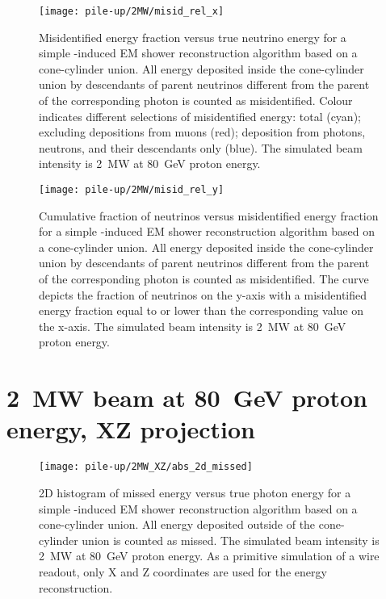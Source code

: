 \begin{figure}[htb]
	\centering
	\texttt{[image: pile-up/2MW/misid\_rel\_x]}
	\caption{Misidentified energy fraction versus true neutrino energy for a simple \Pgpz-induced EM shower reconstruction algorithm based on a cone-cylinder union.
		All energy deposited inside the cone-cylinder union by descendants of parent neutrinos different from the parent of the corresponding \Pgpz photon is counted as misidentified.
		Colour indicates different selections of misidentified energy: total (cyan); excluding depositions from muons (red); deposition from photons, neutrons, and their descendants only (blue).
		The simulated beam intensity is \SI{2}{\mega\watt} at \SI{80}{\giga\electronvolt} proton energy.}
\end{figure}

\begin{figure}[htb]
	\centering
	\texttt{[image: pile-up/2MW/misid\_rel\_y]}
	\caption{Cumulative fraction of neutrinos versus misidentified energy fraction for a simple \Pgpz-induced EM shower reconstruction algorithm based on a cone-cylinder union.
		All energy deposited inside the cone-cylinder union by descendants of parent neutrinos different from the parent of the corresponding \Pgpz photon is counted as misidentified.
		The curve depicts the fraction of neutrinos on the y-axis with a misidentified energy fraction equal to or lower than the corresponding value on the x-axis.
		The simulated beam intensity is \SI{2}{\mega\watt} at \SI{80}{\giga\electronvolt} proton energy.}
\end{figure}

\clearpage


\section{\SI{2}{\mega\watt} beam at \SI{80}{\giga\electronvolt} proton energy, XZ projection}

\begin{figure}[htb]
	\centering
	\texttt{[image: pile-up/2MW\_XZ/abs\_2d\_missed]}
	\caption{2D histogram of missed energy versus true photon energy for a simple \Pgpz-induced EM shower reconstruction algorithm based on a cone-cylinder union.
		All energy deposited outside of the cone-cylinder union is counted as missed.
		The simulated beam intensity is \SI{2}{\mega\watt} at \SI{80}{\giga\electronvolt} proton energy.
		As a primitive simulation of a wire readout, only X and Z coordinates are used for the energy reconstruction.}
\end{figure}

